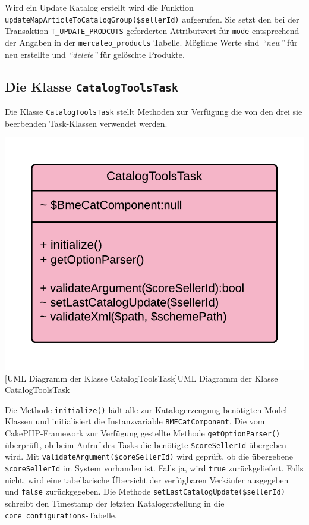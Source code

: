 {	Wird ein Update Katalog erstellt wird die Funktion \texttt{updateMapArticleToCatalogGroup(\$sellerId)} aufgerufen. Sie setzt den bei der Transaktion \texttt{T\_UPDATE\_PRODCUTS} geforderten Attributwert für \texttt{mode} entsprechend der Angaben in der \texttt{mercateo\_products} Tabelle.
	Mögliche Werte sind \textit{\enquote{new}} für neu erstellte und \textit{\enquote{delete}} für gelöschte Produkte.
	
	\subsection{Die Klasse \texttt{CatalogToolsTask}}
	
	Die Klasse \texttt{CatalogToolsTask} stellt Methoden zur Verfügung die von den drei sie beerbenden Task-Klassen verwendet werden.
	
	\begin{minipage}{\linewidth}
		\vspace{1em}
		\centering
		\includegraphics[width=0.5 \linewidth]{img/CatalogToolsTaskUML}
		[UML Diagramm der Klasse CatalogToolsTask]{UML Diagramm der Klasse CatalogToolsTask}
		\vspace{1em}
	\end{minipage}
	
	Die Methode \texttt{initialize()} lädt alle zur Katalogerzeugung benötigten Model-Klassen und initialisiert die Instanzvariable \texttt{BMECatComponent}.
	Die vom CakePHP-Framework zur Verfügung gestellte Methode \texttt{getOptionParser()} überprüft, ob beim Aufruf des Tasks die benötigte \texttt{\$coreSellerId} übergeben wird.
	Mit \texttt{validateArgument(\$coreSellerId)} wird geprüft, ob die übergebene \texttt{\$coreSellerId} im System vorhanden ist. Falls ja, wird \texttt{true} zurückgeliefert. Falls nicht, wird eine tabellarische Übersicht der verfügbaren Verkäufer ausgegeben und \texttt{false} zurückgegeben. Die Methode \texttt{setLastCatalogUpdate(\$sellerId)} schreibt den Timestamp der letzten Katalogerstellung in die \texttt{core\_configurations}-Tabelle.\\
	
}
